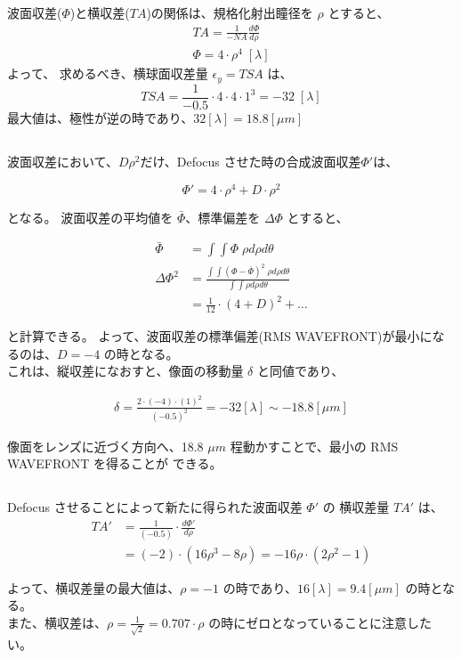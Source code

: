 \documentclass[a4paper,10pt]{jsarticle}
\begin{document}
\subsection{}
波面収差($\Phi$)と横収差($TA$)の関係は、規格化射出瞳径を $\rho$ とすると、
\begin{align*}
TA = \frac{1}{-NA} \frac{d \Phi}{d \rho} \\
\Phi = 4 \cdot \rho^4 \; [\lambda]
\end{align*}
よって、
求めるべき、横球面収差量 $\epsilon_y = TSA$ は、
\begin{equation*}
TSA = \frac{1}{-0.5} \cdot 4 \cdot 4 \cdot {1^3} = -32 \; [\lambda]
\end{equation*}
最大値は、極性が逆の時であり、$ 32[\lambda] = 18.8[\mu m]$

\subsection{}
波面収差において、$D \rho^2$だけ、Defocus させた時の合成波面収差$\Phi'$は、

\begin{equation*}
\Phi' = 4 \cdot \rho^4 + D \cdot \rho^2
\end{equation*}

となる。
波面収差の平均値を $\bar{\Phi}$、標準偏差を $\Delta \Phi$ とすると、

\begin{align*}
\bar{\Phi} &= \int \int \Phi \; \rho d\rho d\theta \\
\Delta \Phi^2 &= \frac{\int \int ({\Phi} - \bar{\Phi})^2 \; \rho d\rho d\theta}{\int \int \rho d\rho d\theta} \\
&= \frac{1}{12} \cdot (4+D)^2 + \dots
\end{align*}

と計算できる。
よって、波面収差の標準偏差(RMS WAVEFRONT)が最小になるのは、$D = -4$ の時となる。\\
これは、縦収差になおすと、像面の移動量 $\delta$ と同値であり、

\begin{align*}
\delta = \frac{2 \cdot (-4) \cdot (1)^2}{(-0.5)^2} = -32 [\lambda] \sim -18.8 [\mu m]
\end{align*}

像面をレンズに近づく方向へ、18.8 $\mu m$ 程動かすことで、最小の RMS WAVEFRONT を得ることが
できる。

\subsection{}

Defocus させることによって新たに得られた波面収差 $\Phi'$ の 横収差量 $TA'$ は、
\begin{align*}
TA' &= \frac{1}{(-0.5)} \cdot \frac{d \Phi'}{d \rho} \\
&= (-2) \cdot (16 {\rho}^3 - 8 {\rho}) = -16 \rho \cdot (2 {\rho}^2 - 1)
\end{align*}

よって、横収差量の最大値は、$\rho = -1 $ の時であり、$16 [\lambda] = 9.4 [\mu m]$ の時となる。\\
また、横収差は、$\rho = \frac{1}{\sqrt{2}} = 0.707 \cdot \rho$ の時にゼロとなっていることに注意したい。
\end{document}
